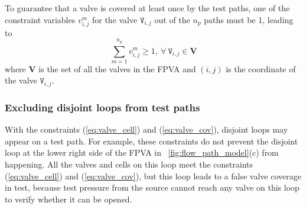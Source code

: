 To guarantee that a valve is covered at least once by the test paths, 
one of the constraint variables $v^m_{i,j}$ for the valve 
$\mathtt{V}_{i,j}$ 
out of the $n_p$ paths 
must be 1, leading to
\begin{equation}
\label{eq:valve_cov}
\sum_{m=1}^{n_p}v^m_{i,j}\ge 1, \ \forall\ \mathtt{V}_{i,j}\in \mathbf{V}
\end{equation}
where $\mathbf{V}$ is the set of all the valves in the FPVA and $(i,j)$ is the
coordinate of the valve $\mathtt{V}_{i,j}$.


 


\subsubsection{Excluding disjoint loops from test paths}\label{sec:disjoint_loop}

With the constraints (\ref{eq:valve_cell}) and (\ref{eq:valve_cov}),
disjoint loops may appear on a test path. 
For example, these constraints do not prevent the disjoint loop at the lower right side of the
FPVA in \figname~\ref{fig:flow_path_model}(c) from happening. All the valves and cells on
this loop meet the constraints (\ref{eq:valve_cell}) and (\ref{eq:valve_cov}),
but this loop leads to a false valve coverage in test,
because test pressure from the source cannot reach 
any valve on this loop to verify whether it can be opened.

